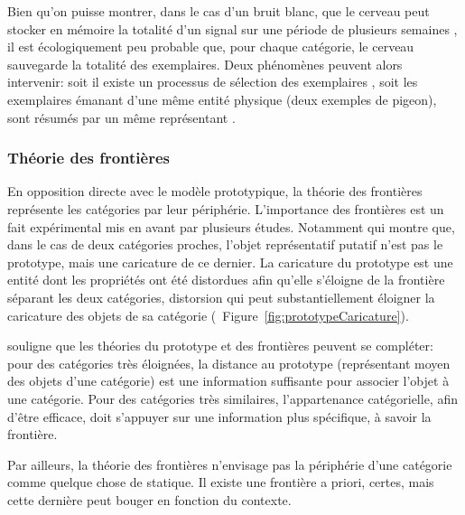 {Bien qu'on puisse montrer, dans le cas d'un bruit blanc, que le cerveau peut stocker en mémoire la totalité d'un signal sur une période de plusieurs semaines  \citep{agus2010rapid}, il est écologiquement peu probable que, pour chaque catégorie, le cerveau sauvegarde la totalité des exemplaires. Deux phénomènes peuvent alors intervenir: soit il existe un processus de sélection des exemplaires \citep{palmeri1995recognition}, soit les exemplaires émanant d'une même entité physique (deux exemples de pigeon), sont résumés par un même représentant \citep{barsalou1998basing} .

\subsubsection{Théorie des frontières}

En opposition directe avec le modèle prototypique, la théorie des frontières représente les catégories par leur périphérie. L'importance des frontières est un fait expérimental mis en avant par plusieurs études. Notamment \citep{davis2010memory} qui montre que, dans le cas de deux catégories proches, l'objet représentatif putatif n'est pas le prototype, mais une caricature de ce dernier. La caricature du prototype est une entité dont les propriétés ont été distordues afin qu'elle s'éloigne de la frontière séparant les deux catégories, distorsion qui peut substantiellement éloigner la caricature des objets de sa catégorie (\cf~Figure~\ref{fig:prototypeCaricature}).

\citep{goldstone2003concepts} souligne que les théories du prototype et des frontières peuvent se compléter: pour des catégories très éloignées, la distance au prototype (représentant moyen des objets d'une catégorie) est une information suffisante pour associer l'objet à une catégorie. Pour des catégories très similaires, l’appartenance catégorielle, afin d'être efficace, doit s'appuyer sur une information plus spécifique, à savoir la frontière.

Par ailleurs, la théorie des frontières n'envisage pas la périphérie d'une catégorie comme quelque chose de statique. Il existe une frontière a priori, certes, mais cette dernière peut bouger en fonction du contexte.

}
